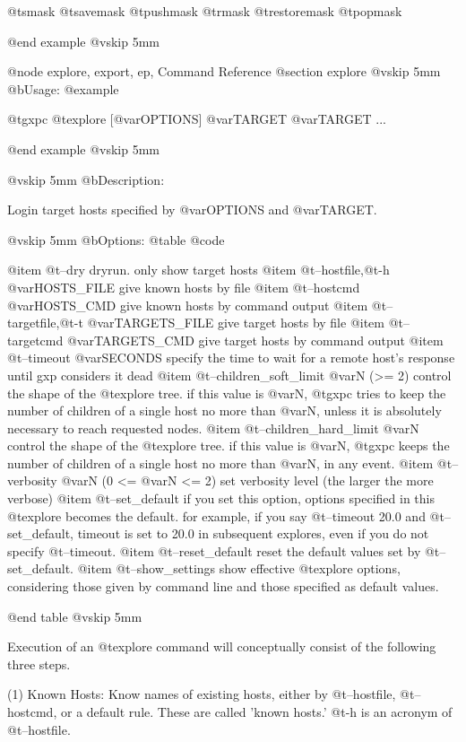   @t{smask} @t{savemask} @t{pushmask} @t{rmask} @t{restoremask} @t{popmask}

@end example
@vskip 5mm

@node explore, export, ep, Command Reference
@section explore
@vskip 5mm
@b{Usage:}
@example

  @t{gxpc} @t{explore} [@var{OPTIONS}] @var{TARGET} @var{TARGET} ...

@end example
@vskip 5mm

@vskip 5mm
@b{Description:}


  Login target hosts specified by @var{OPTIONS} and @var{TARGET}.

@vskip 5mm
@b{Options:}
@table @code

@item   @t{--dry}
    dryrun. only show target hosts
@item   @t{--hostfile},@t{-h} @var{HOSTS_FILE}
    give known hosts by file
@item   @t{--hostcmd} @var{HOSTS_CMD}
    give known hosts by command output
@item   @t{--targetfile},@t{-t} @var{TARGETS_FILE}
    give target hosts by file
@item   @t{--targetcmd} @var{TARGETS_CMD}
    give target hosts by command output
@item   @t{--timeout} @var{SECONDS}
    specify the time to wait for a remote host's response
    until gxp considers it dead
@item   @t{--children_soft_limit} @var{N} (>= 2)
    control the shape of the @t{explore} tree. if this value is @var{N}, @t{gxpc}
    tries to keep the number of children of a single host no more than @var{N},
    unless it is absolutely necessary to reach requested nodes.
@item   @t{--children_hard_limit} @var{N}
    control the shape of the @t{explore} tree. if this value is @var{N}, @t{gxpc}
    keeps the number of children of a single host no more than @var{N}, in any event.
@item   @t{--verbosity} @var{N} (0 <= @var{N} <= 2)
    set verbosity level (the larger the more verbose)
@item   @t{--set_default}
    if you set this option, options specified in this @t{explore} becomes the default.
    for example, if you say @t{--timeout} 20.0 and @t{--set_default}, timeout is set to
    20.0 in subsequent explores, even if you do not specify @t{--timeout}.
@item   @t{--reset_default}
    reset the default values set by @t{--set_default}.
@item   @t{--show_settings}
    show effective @t{explore} options, considering those given by command line and
    those specified as default values.

@end table
@vskip 5mm

Execution of an @t{explore} command will conceptually consist of the
following three steps.

(1) Known Hosts: Know names of existing hosts, either by
@t{--hostfile}, @t{--hostcmd}, or a default rule. These are called
'known hosts.' @t{-h} is an acronym of @t{--hostfile}.

